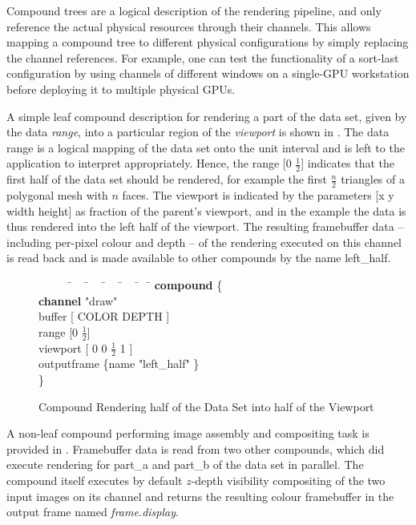 Compound trees are a logical description of the rendering pipeline, and only
reference the actual physical resources through their channels. This allows
mapping a compound tree to different physical configurations by simply
replacing the channel references. For example, one can test the functionality
of a sort-last configuration by using channels of different windows on a
single-GPU workstation before deploying it to multiple physical GPUs.

A simple leaf compound description for rendering a part of the data set, given
by the data {\em range}, into a particular region of the {\em viewport} is
shown in . The data range is a logical mapping of the
data set onto the unit interval and is left to the application to interpret
appropriately. Hence, the range [0 $\frac{1}{2}$] indicates that the first half
of the data set should be rendered, for example the first $\frac{n}{2}$
triangles of a polygonal mesh with $n$ faces. The viewport is indicated by the
parameters [x y width height] as fraction of the parent's viewport, and in the
example the data is thus rendered into the left half of the viewport. The
resulting framebuffer data -- including per-pixel colour and depth -- of the
rendering executed on this channel is read back and is made available to other
compounds by the name left\_half.

\begin{figure}[h!t]\center
 {\begin{tabbing} \ \ \ \ \ \=\ \ \ \=\ \ \ \=\ \ \ \=\ \ \ \=\ \ \ \= \kill
   \> {\bf compound} \{						\\
   \>\> {\bf channel} "draw"					\\
   \>\> buffer  [ COLOR DEPTH ]				\\
   \>\> range [0 $\frac{1}{2}$]				\\
   \>\> viewport [ 0 0 $\frac{1}{2}$ 1 ]                 \\
   \>\> outputframe \{name "left\_half" \}	\\
   \> \}
  \end{tabbing}}
 \vspace{-2mm}
 \caption{Compound Rendering half of the Data Set into half of the Viewport\label{FIG_leaf_compound}}
\end{figure}

A non-leaf compound performing image assembly and compositing task is
provided in . Framebuffer data is read from two other
compounds, which did execute rendering for part\_a and part\_b of the data
set in parallel. The compound itself executes by default $z$-depth visibility
compositing of the two input images on its channel and returns the resulting
colour framebuffer in the output frame named {\em frame.display}.

